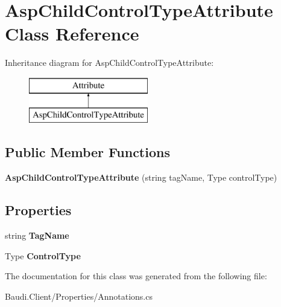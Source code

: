 \hypertarget{class_asp_child_control_type_attribute}{}\section{Asp\+Child\+Control\+Type\+Attribute Class Reference}
\label{class_asp_child_control_type_attribute}
Inheritance diagram for Asp\+Child\+Control\+Type\+Attribute\+:\begin{figure}[H]
\begin{center}
\leavevmode
\includegraphics[height=2.000000cm]{class_asp_child_control_type_attribute}
\end{center}
\end{figure}
\subsection*{Public Member Functions}
\begin{DoxyCompactItemize}
\item 
\hypertarget{class_asp_child_control_type_attribute_ad547dcf065ac2d1092f0cce82cc26fe7}{}{\bfseries Asp\+Child\+Control\+Type\+Attribute} (string tag\+Name, Type control\+Type)\label{class_asp_child_control_type_attribute_ad547dcf065ac2d1092f0cce82cc26fe7}

\end{DoxyCompactItemize}
\subsection*{Properties}
\begin{DoxyCompactItemize}
\item 
\hypertarget{class_asp_child_control_type_attribute_a9e30613d70a3bcffb32a4664a5d121d2}{}string {\bfseries Tag\+Name}\label{class_asp_child_control_type_attribute_a9e30613d70a3bcffb32a4664a5d121d2}

\item 
\hypertarget{class_asp_child_control_type_attribute_a6c6421f394baa882056b2dfc3efcd284}{}Type {\bfseries Control\+Type}\label{class_asp_child_control_type_attribute_a6c6421f394baa882056b2dfc3efcd284}

\end{DoxyCompactItemize}


The documentation for this class was generated from the following file\+:\begin{DoxyCompactItemize}
\item 
Baudi.\+Client/\+Properties/Annotations.\+cs\end{DoxyCompactItemize}
